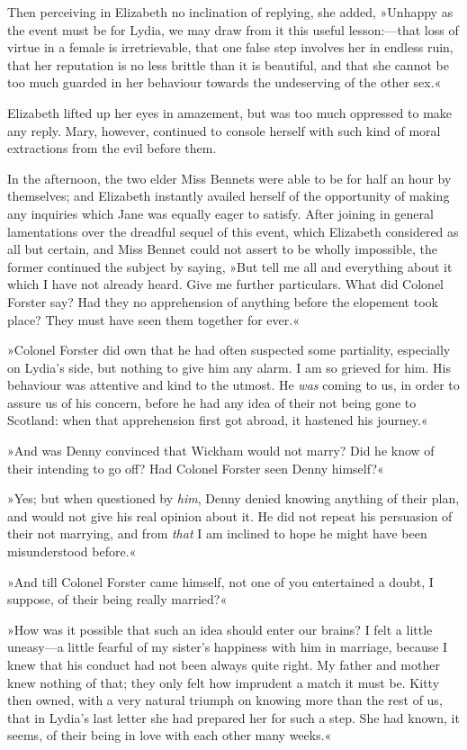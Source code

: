 Then perceiving in Elizabeth no inclination of replying, she added, »Unhappy as the event must be for Lydia, we may draw from it this useful lesson:—that loss of virtue in a female is irretrievable, that one false step involves her in endless ruin, that her reputation is no less brittle than it is beautiful, and that she cannot be too much guarded in her behaviour towards the undeserving of the other sex.«

Elizabeth lifted up her eyes in amazement, but was too much oppressed to make any reply. Mary, however, continued to console herself with such kind of moral extractions from the evil before them.

In the afternoon, the two elder Miss Bennets were able to be for half an hour by themselves; and Elizabeth instantly availed herself of the opportunity of making any inquiries which Jane was equally eager to satisfy. After joining in general lamentations over the dreadful sequel of this event, which Elizabeth considered as all but certain, and Miss Bennet could not assert to be wholly impossible, the former continued the subject by saying, »But tell me all and everything about it which I have not already heard. Give me further particulars. What did Colonel Forster say? Had they no apprehension of anything before the elopement took place? They must have seen them together for ever.«

»Colonel Forster did own that he had often suspected some partiality, especially on Lydia's side, but nothing to give him any alarm. I am so grieved for him. His behaviour was attentive and kind to the utmost. He \textit{was} coming to us, in order to assure us of his concern, before he had any idea of their not being gone to Scotland: when that apprehension first got abroad, it hastened his journey.«

»And was Denny convinced that Wickham would not marry? Did he know of their intending to go off? Had Colonel Forster seen Denny himself?«

»Yes; but when questioned by \textit{him}, Denny denied knowing anything of their plan, and would not give his real opinion about it. He did not repeat his persuasion of their not marrying, and from \textit{that} I am inclined to hope he might have been misunderstood before.«

»And till Colonel Forster came himself, not one of you entertained a doubt, I suppose, of their being really married?«

»How was it possible that such an idea should enter our brains? I felt a little uneasy—a little fearful of my sister's happiness with him in marriage, because I knew that his conduct had not been always quite right. My father and mother knew nothing of that; they only felt how imprudent a match it must be. Kitty then owned, with a very natural triumph on knowing more than the rest of us, that in Lydia's last letter she had prepared her for such a step. She had known, it seems, of their being in love with each other many weeks.«

